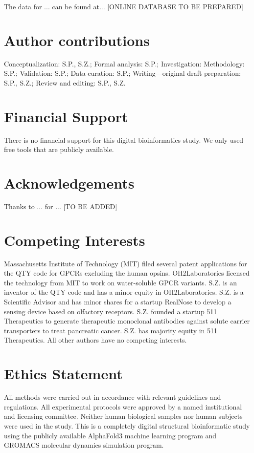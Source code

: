 \documentclass[fleqn,10pt,lineno]{manuscript}
\begin{document}
The data for ... can be found at... [ONLINE DATABASE TO BE PREPARED]

\section*{Author contributions}

Conceptualization: S.P., S.Z.; Formal analysis: S.P.; Investigation: Methodology: S.P.; Validation: S.P.; Data curation: S.P.; Writing—original draft preparation: S.P., S.Z.; Review and editing: S.P., S.Z. 

\section*{Financial Support}

There is no financial support for this digital bioinformatics study. We only used free tools that are publicly available. 

\section*{Acknowledgements}

Thanks to ... for ... [TO BE ADDED]


\section*{Competing Interests}

Massachusetts Institute of Technology (MIT) filed several patent applications for the QTY code for GPCRs excluding the human opsins. OH2Laboratories licensed the technology from MIT to work on water-soluble GPCR variants. S.Z. is an inventor of the QTY code and has a minor equity in OH2Laboratories. S.Z. is a Scientific Advisor and has minor shares for a startup RealNose to develop a sensing device based on olfactory receptors. S.Z. founded a startup 511 Therapeutics to generate therapeutic monoclonal antibodies against solute carrier transporters to treat pancreatic cancer. S.Z. has majority equity in 511 Therapeutics. All other authors have no competing interests.


\section*{Ethics Statement}

All methods were carried out in accordance with relevant guidelines and regulations. All experimental protocols were approved by a named institutional and licensing committee. Neither human biological samples nor human subjects were used in the study. This is a completely digital structural bioinformatic study using the publicly available AlphaFold3 machine learning program and GROMACS molecular dynamics simulation program.
\end{document}

